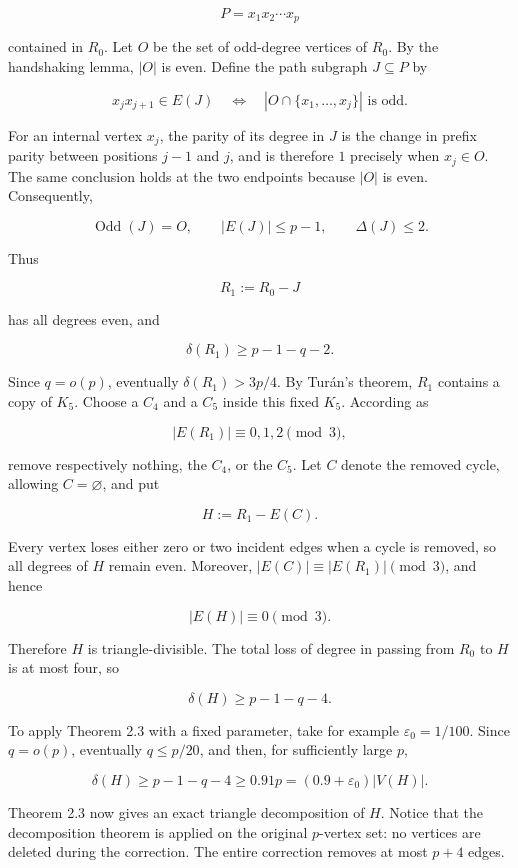 \documentclass[
  american,
  11pt,
  a4paper,
]{article}
\begin{document}
\[
P=x_1x_2\cdots x_p
\]

contained in \(R_0\). Let \(O\) be the set of odd-degree vertices of \(R_0\). By the handshaking lemma, \(|O|\) is even. Define the path subgraph \(J\subseteq P\) by

\[
x_jx_{j+1}\in E(J)
\quad\Longleftrightarrow\quad
|O\cap\{x_1,\ldots,x_j\}|\text{ is odd}.
\tag{8.5}
\]

For an internal vertex \(x_j\), the parity of its degree in \(J\) is the change in prefix parity between positions \(j-1\) and \(j\), and is therefore \(1\) precisely when \(x_j\in O\). The same conclusion holds at the two endpoints because \(|O|\) is even. Consequently,

\[
\operatorname{Odd}(J)=O,
\qquad
|E(J)|\le p-1,
\qquad
\Delta(J)\le2.
\tag{8.6}
\]

Thus

\[
R_1:=R_0-J
\]

has all degrees even, and

\[
\delta(R_1)\ge p-1-q-2.
\tag{8.7}
\]

Since \(q=o(p)\), eventually \(\delta(R_1)>3p/4\). By Turán's theorem, \(R_1\) contains a copy of \(K_5\). Choose a \(C_4\) and a \(C_5\) inside this fixed \(K_5\). According as

\[
|E(R_1)|\equiv0,1,2\pmod3,
\]

remove respectively nothing, the \(C_4\), or the \(C_5\). Let \(C\) denote the removed cycle, allowing \(C=\varnothing\), and put

\[
H:=R_1-E(C).
\]

Every vertex loses either zero or two incident edges when a cycle is removed, so all degrees of \(H\) remain even. Moreover, \(|E(C)|\equiv |E(R_1)|\pmod3\), and hence

\[
|E(H)|\equiv0\pmod3.
\]

Therefore \(H\) is triangle-divisible. The total loss of degree in passing from \(R_0\) to \(H\) is at most four, so

\[
\delta(H)\ge p-1-q-4.
\tag{8.8}
\]

To apply Theorem 2.3 with a fixed parameter, take for example \(\varepsilon_0=1/100\). Since \(q=o(p)\), eventually \(q\le p/20\), and then, for sufficiently large \(p\),

\[
\delta(H)\ge p-1-q-4\ge0.91p=(0.9+\varepsilon_0)|V(H)|.
\tag{8.9}
\]

Theorem 2.3 now gives an exact triangle decomposition of \(H\). Notice that the decomposition theorem is applied on the original \(p\)-vertex set: no vertices are deleted during the correction. The entire correction removes at most \(p+4\) edges.
\end{document}
